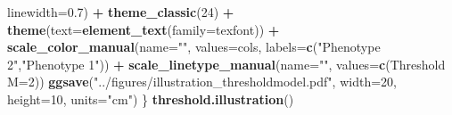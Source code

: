 \documentclass[
]{article}
\newenvironment{Shaded}{\begin{snugshade}}{\end{snugshade}}
\newcommand{\AttributeTok}[1]{\textcolor[rgb]{0.13,0.29,0.53}{#1}}
\newcommand{\DecValTok}[1]{\textcolor[rgb]{0.00,0.00,0.81}{#1}}
\newcommand{\FloatTok}[1]{\textcolor[rgb]{0.00,0.00,0.81}{#1}}
\newcommand{\FunctionTok}[1]{\textcolor[rgb]{0.13,0.29,0.53}{\textbf{#1}}}
\newcommand{\NormalTok}[1]{#1}
\newcommand{\OtherTok}[1]{\textcolor[rgb]{0.56,0.35,0.01}{#1}}
\newcommand{\SpecialCharTok}[1]{\textcolor[rgb]{0.81,0.36,0.00}{\textbf{#1}}}
\newcommand{\StringTok}[1]{\textcolor[rgb]{0.31,0.60,0.02}{#1}}
\begin{document}
\begin{Shaded}
\begin{Highlighting}[]
               \AttributeTok{linewidth=}\FloatTok{0.7}\NormalTok{) }\SpecialCharTok{+}
    \FunctionTok{theme\_classic}\NormalTok{(}\DecValTok{24}\NormalTok{) }\SpecialCharTok{+} \FunctionTok{theme}\NormalTok{(}\AttributeTok{text=}\FunctionTok{element\_text}\NormalTok{(}\AttributeTok{family=}\NormalTok{texfont)) }\SpecialCharTok{+}
    \FunctionTok{scale\_color\_manual}\NormalTok{(}\AttributeTok{name=}\StringTok{""}\NormalTok{, }\AttributeTok{values=}\NormalTok{cols,}
                       \AttributeTok{labels=}\FunctionTok{c}\NormalTok{(}\StringTok{"Phenotype 2"}\NormalTok{,}\StringTok{"Phenotype 1"}\NormalTok{)) }\SpecialCharTok{+}
    \FunctionTok{scale\_linetype\_manual}\NormalTok{(}\AttributeTok{name=}\StringTok{""}\NormalTok{, }\AttributeTok{values=}\FunctionTok{c}\NormalTok{(}\StringTok{\textquotesingle{}Threshold M\textquotesingle{}}\OtherTok{=}\DecValTok{2}\NormalTok{))}
  \FunctionTok{ggsave}\NormalTok{(}\StringTok{"../figures/illustration\_thresholdmodel.pdf"}\NormalTok{,}
         \AttributeTok{width=}\DecValTok{20}\NormalTok{, }\AttributeTok{height=}\DecValTok{10}\NormalTok{, }\AttributeTok{units=}\StringTok{"cm"}\NormalTok{)  }
\NormalTok{\}}
\FunctionTok{threshold.illustration}\NormalTok{()}
\end{Highlighting}
\end{Shaded}
\end{document}
